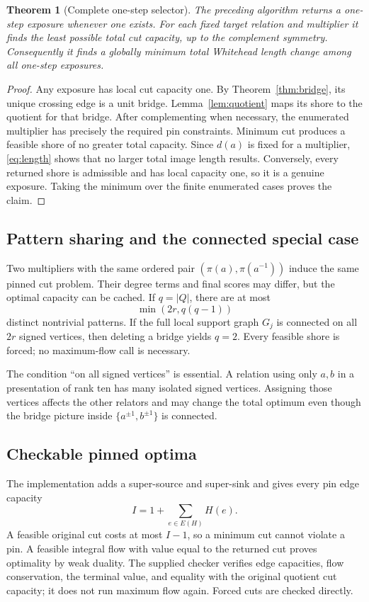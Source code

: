 \documentclass[11pt,letterpaper]{article}
\newtheorem{theorem}{Theorem}[section]
\theoremstyle{definition}\newtheorem{definition}[theorem]{Definition}
\newcommand{\set}[1]{\{#1\}}
\begin{document}
\begin{theorem}[Complete one-step selector]\label{thm:selector}
The preceding algorithm returns a one-step exposure whenever one exists. For each fixed target relation and multiplier it finds the least possible total cut capacity, up to the complement symmetry. Consequently it finds a globally minimum total Whitehead length change among all one-step exposures.
\end{theorem}
\begin{proof}
Any exposure has local cut capacity one. By Theorem~\ref{thm:bridge}, its unique crossing edge is a unit bridge. Lemma~\ref{lem:quotient} maps its shore to the quotient for that bridge. After complementing when necessary, the enumerated multiplier has precisely the required pin constraints. Minimum cut produces a feasible shore of no greater total capacity. Since $d(a)$ is fixed for a multiplier, \eqref{eq:length} shows that no larger total image length results. Conversely, every returned shore is admissible and has local capacity one, so it is a genuine exposure. Taking the minimum over the finite enumerated cases proves the claim.
\end{proof}

\subsection{Pattern sharing and the connected special case}
Two multipliers with the same ordered pair $(\pi(a),\pi(a^{-1}))$ induce the same pinned cut problem. Their degree terms and final scores may differ, but the optimal capacity can be cached. If $q=|Q|$, there are at most
\begin{equation}\label{eq:patterns}
 \min(2r,q(q-1))
\end{equation}
distinct nontrivial patterns. If the full local support graph $G_j$ is connected on all $2r$ signed vertices, then deleting a bridge yields $q=2$. Every feasible shore is forced; no maximum-flow call is necessary.

The condition ``on all signed vertices'' is essential. A relation using only $a,b$ in a presentation of rank ten has many isolated signed vertices. Assigning those vertices affects the other relators and may change the total optimum even though the bridge picture inside $\set{a^{\pm1},b^{\pm1}}$ is connected.

\subsection{Checkable pinned optima}
The implementation adds a super-source and super-sink and gives every pin edge capacity
\[
 I=1+\sum_{e\in E(H)}H(e).
\]
A feasible original cut costs at most $I-1$, so a minimum cut cannot violate a pin. A feasible integral flow with value equal to the returned cut proves optimality by weak duality. The supplied checker verifies edge capacities, flow conservation, the terminal value, and equality with the original quotient cut capacity; it does not run maximum flow again. Forced cuts are checked directly.
\end{document}
